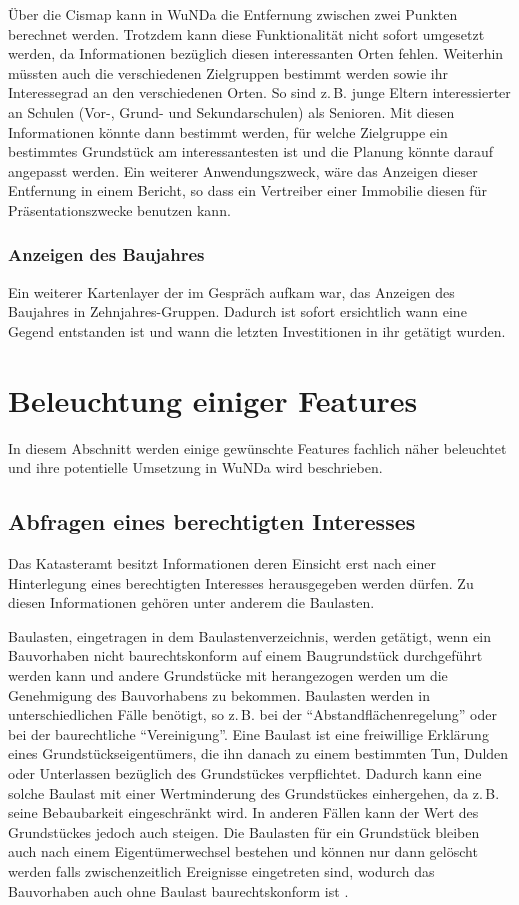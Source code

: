 Über die Cismap kann in \ac{WuNDa} die Entfernung zwischen zwei Punkten berechnet werden.
Trotzdem kann diese Funktionalität nicht sofort umgesetzt werden, da Informationen bezüglich diesen interessanten Orten fehlen.
Weiterhin müssten auch die verschiedenen Zielgruppen bestimmt werden sowie ihr Interessegrad an den verschiedenen Orten.
So sind z.\,B. junge Eltern interessierter an Schulen (Vor-, Grund- und Sekundarschulen) als Senioren.
Mit diesen Informationen könnte dann bestimmt werden, für welche Zielgruppe ein bestimmtes Grundstück am interessantesten ist und die Planung könnte darauf angepasst werden.
Ein weiterer Anwendungszweck, wäre das Anzeigen dieser Entfernung in einem Bericht, so dass ein Vertreiber einer Immobilie diesen für Präsentationszwecke benutzen kann.

\subsubsection{Anzeigen des Baujahres}
Ein weiterer Kartenlayer der im Gespräch aufkam war, das Anzeigen des Baujahres in Zehnjahres-Gruppen.
Dadurch ist sofort ersichtlich wann eine Gegend entstanden ist und wann die letzten Investitionen in ihr getätigt wurden.

\section{Beleuchtung einiger Features}

In diesem Abschnitt werden einige gewünschte Features fachlich näher beleuchtet und ihre potentielle Umsetzung in \ac{WuNDa} wird beschrieben.

\subsection{Abfragen eines berechtigten Interesses}
\label{subsec:berechtigtes-interesse}
Das Katasteramt besitzt Informationen deren Einsicht erst nach einer Hinterlegung eines berechtigten Interesses herausgegeben werden dürfen.
Zu diesen Informationen gehören unter anderem die Baulasten.

Baulasten, eingetragen in dem Baulastenverzeichnis, werden getätigt, wenn ein Bauvorhaben nicht baurechtskonform auf einem Baugrundstück durchgeführt werden kann und andere Grundstücke mit herangezogen werden um die Genehmigung des Bauvorhabens zu bekommen.
Baulasten werden in unterschiedlichen Fälle benötigt, so z.\,B. bei der \enquote{Abstandflächenregelung} oder bei der baurechtliche \enquote{Vereinigung}.
Eine Baulast ist eine freiwillige Erklärung eines Grundstückseigentümers, die ihn danach zu einem bestimmten Tun, Dulden oder Unterlassen bezüglich des Grundstückes verpflichtet.
Dadurch kann eine solche Baulast mit einer Wertminderung des Grundstückes einhergehen, da z.\,B. seine Bebaubarkeit eingeschränkt wird.
In anderen Fällen kann der Wert des Grundstückes jedoch auch steigen.
Die Baulasten für ein Grundstück bleiben auch nach einem Eigentümerwechsel bestehen und können nur dann gelöscht werden falls zwischenzeitlich Ereignisse eingetreten sind, wodurch das Bauvorhaben auch ohne Baulast baurechtskonform ist \autocite[vgl.][]{herne-baulasten}.

